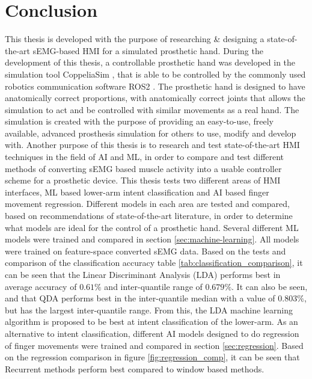 \documentclass[../main.tex]{subfiles}
\begin{document}
\section{Conclusion}

This thesis is developed with the purpose of researching \& designing a state-of-the-art sEMG-based HMI for a simulated prosthetic hand.
During the development of this thesis, a controllable prosthetic hand was developed in the simulation tool CoppeliaSim \cite{coppeliasim}, that is able to be controlled by the commonly used robotics communication software ROS2 \cite{ros2}.
The prosthetic hand is designed to have anatomically correct proportions, with anatomically correct joints that allows the simulation to act and be controlled with similar movements as a real hand. 
The simulation is created with the purpose of providing an easy-to-use, freely available, advanced prosthesis simulation for others to use, modify and develop with. 
Another purpose of this thesis is to research and test state-of-the-art HMI techniques in the field of AI and ML, in order to compare and test different methods of converting sEMG based muscle activity into a usable controller scheme for a prosthetic device.
This thesis tests two different areas of HMI interfaces, ML based lower-arm intent classification and AI based finger movement regression.
Different models in each area are tested and compared, based on recommendations of state-of-the-art
literature, in order to determine what models are ideal for the control of a prosthetic hand.
Several different ML models were trained and compared in section \ref{sec:machine-learning}.
All models were trained on feature-space converted sEMG data.
Based on the tests and comparison of the classification accuracy table \ref{tab:classification_comparison}, it can be seen that the Linear Discriminant Analysis (LDA) performs best in average accuracy of $0.61\%$ and inter-quantile range of $0.679\%$.
It can also be seen, and that QDA performs best in the inter-quantile median with a value of $0.803\%$, but has the largest inter-quantile range.
From this, the LDA machine learning algorithm is proposed to be best at intent classification of the lower-arm.
As an alternative to intent classification, different AI models designed to do regression of finger movements were trained and compared in section \ref{sec:regression}.
Based on the regression comparison in figure \ref{fig:regression_comp}, it can be seen that Recurrent methods perform best compared to window based methods.
\end{document}
